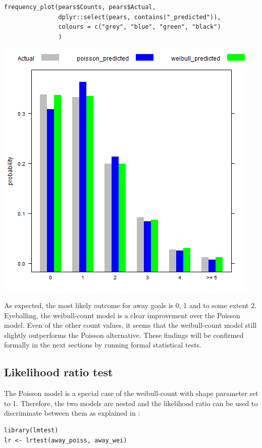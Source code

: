 \documentclass[a4paper,twoside,11pt]{article}
\begin{document}
\begin{verbatim}
frequency_plot(pears$Counts, pears$Actual,
               dplyr::select(pears, contains("_predicted")),
               colours = c("grey", "blue", "green", "black")
               )
\end{verbatim}

\begin{center}
\includegraphics[width=.9\linewidth]{foot_hist.png}
\end{center}



As expected, the most likely outcome for away goals is 0, 1 and to some
extent 2. Eyeballing, the weibull-count model is a clear improvement 
over the Poisson model. Even of the other count values, it seems that the
weibull-count model still slightly outperforms the Poisson alternative. These
findings will be confirmed formally in the next sections by running formal
statistical tests.

\subsection{Likelihood ratio test}
\label{sec:orgb23e441}
The Poisson model is a special case of the weibull-count with shape parameter
set to 1. Therefore, the two models are nested and the likelihood ratio can be
used to discriminate between them as explained in \citet[Chapter 6]{cameron2013regression}:
\begin{verbatim}
library(lmtest)
lr <- lrtest(away_poiss, away_wei)
\end{verbatim}
\end{document}
